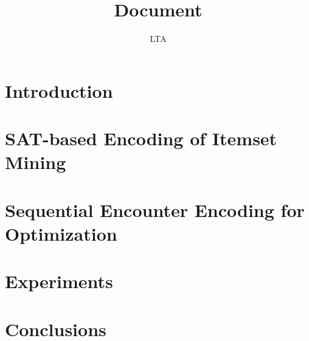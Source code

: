 \documentclass[13pt,a4paper]{report}
\title{Document}
\author{LTA}
\begin{document}










\fontsize{13}{15}\selectfont

\chapter{Introduction}




\chapter{SAT-based Encoding of Itemset Mining}






\chapter{Sequential Encounter Encoding for Optimization}




\chapter{Experiments}



\chapter{Conclusions}



\nocite{*}
\renewcommand{\bibname}{References}
\printbibliography
{}
\end{document}
